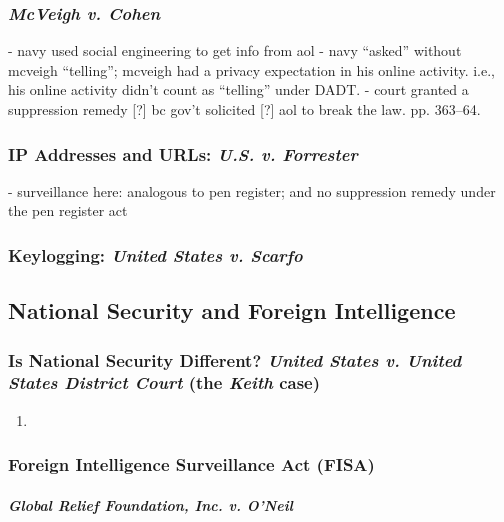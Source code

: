 \subsubsection{\emph{McVeigh v. Cohen}}

- navy used social engineering to get info from aol
- navy ``asked'' without mcveigh ``telling''; mcveigh had a privacy 
expectation in his online activity. i.e., his online activity didn't count as 
``telling'' under DADT.
- court granted a suppression remedy [?] bc gov't solicited [?] aol to break the 
law. pp. 363--64.

\subsubsection{IP Addresses and URLs: \emph{U.S. v. Forrester}}


- surveillance here: analogous to pen register; and no suppression remedy 
under the pen register act

\subsubsection{Keylogging: \emph{United States v. Scarfo}}


\subsection{National Security and Foreign Intelligence}

\subsubsection{Is National Security Different? \emph{United States v. United 
States District Court} (the \emph{Keith} case)}

\begin{enumerate}
    \item %
\end{enumerate}

\subsubsection{Foreign Intelligence Surveillance Act (FISA)}

\paragraph{\emph{Global Relief Foundation, Inc. v. O'Neil}} %

